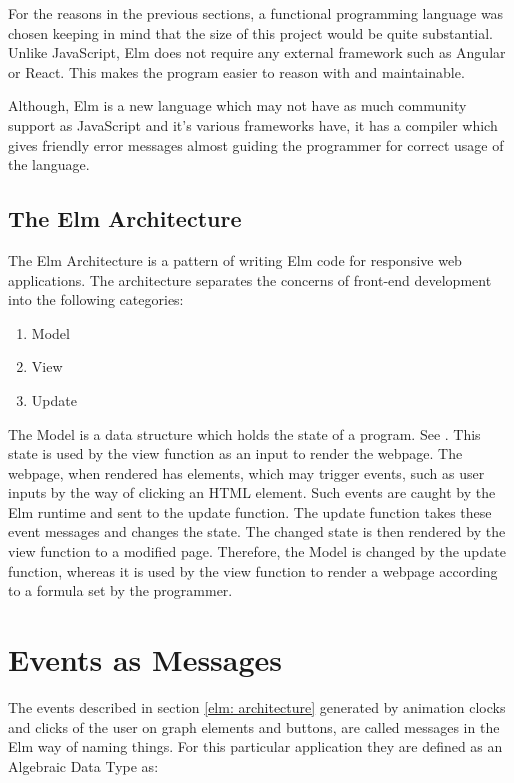 For the reasons in the previous sections, a functional programming language was chosen
keeping in mind that the size of this project would be quite substantial.
Unlike JavaScript, Elm does not require any external framework such as Angular
or React. This makes the program easier to reason with and maintainable.

Although, Elm is a new language which may not have as much community support as
JavaScript and it's various frameworks have, it has a compiler which gives
friendly error messages almost guiding the programmer for correct usage of the
language.

\subsection{The Elm Architecture}
\label{elm: architecture}
The Elm Architecture is a pattern of writing Elm code for responsive web applications. 
The architecture separates the concerns of front-end development into the following categories:

\begin{enumerate}
\item Model
\item View
\item Update
\end{enumerate}

The Model is a data structure which holds the state of a program. See
\cite{Fairbank19}. This state is used by the view function as an input to
render the webpage.  The webpage, when rendered has elements, which may trigger
events, such as user inputs by the way of clicking an HTML element. Such events
are caught by the Elm runtime and sent to the update function.  The update
function takes these event messages and changes the state. The changed state is
then rendered by the view function to a modified page.  Therefore, the Model is
changed by the update function, whereas it is used by the view function to
render a webpage according to a formula set by the programmer.


\section{Events as Messages}
\label{impl: messages}
The events described in section \autoref{elm: architecture} generated by
animation clocks and clicks of the user on graph elements and buttons, are
called messages in the Elm way of naming things. For this particular
application they are defined as an Algebraic Data Type as:

